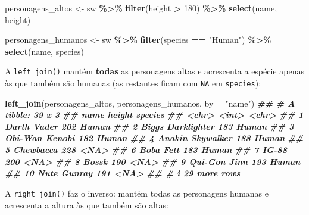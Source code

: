 \documentclass[
  portuguese,
  11pt,
  openany]{book}
\newenvironment{Shaded}{\begin{snugshade}}{\end{snugshade}}
\newcommand{\AttributeTok}[1]{\textcolor[rgb]{0.13,0.29,0.53}{#1}}
\newcommand{\DecValTok}[1]{\textcolor[rgb]{0.00,0.00,0.81}{#1}}
\newcommand{\DocumentationTok}[1]{\textcolor[rgb]{0.56,0.35,0.01}{\textbf{\textit{#1}}}}
\newcommand{\FunctionTok}[1]{\textcolor[rgb]{0.13,0.29,0.53}{\textbf{#1}}}
\newcommand{\NormalTok}[1]{#1}
\newcommand{\OtherTok}[1]{\textcolor[rgb]{0.56,0.35,0.01}{#1}}
\newcommand{\SpecialCharTok}[1]{\textcolor[rgb]{0.81,0.36,0.00}{\textbf{#1}}}
\newcommand{\StringTok}[1]{\textcolor[rgb]{0.31,0.60,0.02}{#1}}
\begin{document}
\begin{Shaded}
\begin{Highlighting}[]
\NormalTok{personagens\_altos }\OtherTok{\textless{}{-}}\NormalTok{ sw }\SpecialCharTok{\%\textgreater{}\%}
  \FunctionTok{filter}\NormalTok{(height }\SpecialCharTok{\textgreater{}} \DecValTok{180}\NormalTok{) }\SpecialCharTok{\%\textgreater{}\%}
  \FunctionTok{select}\NormalTok{(name, height)}

\NormalTok{personagens\_humanos }\OtherTok{\textless{}{-}}\NormalTok{ sw }\SpecialCharTok{\%\textgreater{}\%}
  \FunctionTok{filter}\NormalTok{(species }\SpecialCharTok{==} \StringTok{"Human"}\NormalTok{) }\SpecialCharTok{\%\textgreater{}\%}
  \FunctionTok{select}\NormalTok{(name, species)}
\end{Highlighting}
\end{Shaded}

A \texttt{left\_join()} mantém \textbf{todas} as personagens altas e acrescenta a espécie apenas às
que também são humanas (as restantes ficam com \texttt{NA} em \texttt{species}):

\begin{Shaded}
\begin{Highlighting}[]
\FunctionTok{left\_join}\NormalTok{(personagens\_altos, personagens\_humanos, }\AttributeTok{by =} \StringTok{"name"}\NormalTok{)}
\DocumentationTok{\#\# \# A tibble: 39 x 3}
\DocumentationTok{\#\#    name              height species}
\DocumentationTok{\#\#    \textless{}chr\textgreater{}              \textless{}int\textgreater{} \textless{}chr\textgreater{}  }
\DocumentationTok{\#\#  1 Darth Vader          202 Human  }
\DocumentationTok{\#\#  2 Biggs Darklighter    183 Human  }
\DocumentationTok{\#\#  3 Obi{-}Wan Kenobi       182 Human  }
\DocumentationTok{\#\#  4 Anakin Skywalker     188 Human  }
\DocumentationTok{\#\#  5 Chewbacca            228 \textless{}NA\textgreater{}   }
\DocumentationTok{\#\#  6 Boba Fett            183 Human  }
\DocumentationTok{\#\#  7 IG{-}88                200 \textless{}NA\textgreater{}   }
\DocumentationTok{\#\#  8 Bossk                190 \textless{}NA\textgreater{}   }
\DocumentationTok{\#\#  9 Qui{-}Gon Jinn         193 Human  }
\DocumentationTok{\#\# 10 Nute Gunray          191 \textless{}NA\textgreater{}   }
\DocumentationTok{\#\# \# i 29 more rows}
\end{Highlighting}
\end{Shaded}

A \texttt{right\_join()} faz o inverso: mantém todas as personagens humanas e acrescenta a
altura às que também são altas:
\end{document}
